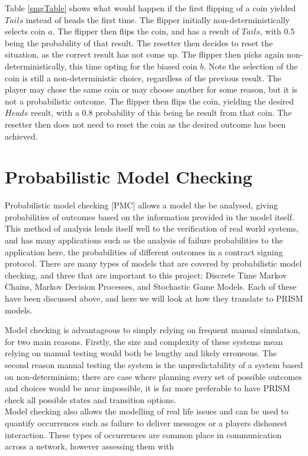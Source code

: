 \documentclass{l4proj}
\begin{document}
Table \ref{smgTable} shows what would happen if the first flipping of a coin yielded $Tails$ instead of heads the first time. The flipper initially non-deterministically selects coin $a$. The flipper then flips the coin, and has a result of $Tails$, with 0.5 being the probability of that result.
The resetter then decides to reset the situation, as the correct result has not come up. 
The flipper then picks again non-deterministically, this time opting for the biased coin $b$. Note the selection of the coin is still a non-deterministic choice, regardless of the previous result. The player may chose the same coin or may choose another for some reason, but it is not a probabilistic outcome. The flipper then flips the coin, yielding the desired $Heads$ result, with a 0.8 probability of this being he result from that coin. 
The resetter then does not need to reset the coin as the desired outcome has been achieved.



\section{Probabilistic Model Checking}


Probabilistic model checking [PMC] \cite{gentle} allows a model the be analysed, giving probabilities of outcomes based on the information provided in the model itself. This method of analysis lends itself well to the verification of real world systems, and has many applications such as the analysis of failure probabilities to the application here, the probabilities of different outcomes in a contract signing protocol. There are many types of models that are covered by probabilistic model checking, and three that are important to this project; Discrete Time Markov Chains, Markov Decision Processes, and Stochastic Game Models. Each of these have been discussed above, and here we will look at how they translate to PRISM models.

 Model checking is advantageous to simply relying on frequent manual simulation, for two main reasons. Firstly, the size and complexity of these systems mean relying on manual testing would both be lengthy and likely erroneous. The second reason manual testing the system is the unpredictability of a system based on non-determinism; there are case where planning every set of possible outcomes and choices would be near impossible, it is far more preferable to have PRISM check all possible states and transition options. \\
 Model checking also allows the modelling of real life issues and can be used to quantify occurrences such as failure to deliver messages or a players dishonest interaction. These types of occurrences are common place in communication across a network, however assessing them with 
\end{document}
